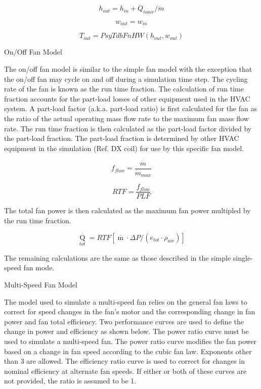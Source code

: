 \begin{equation}
{h_{out}} = {h_{in}} + {\dot Q_{toair}}/\dot m
\end{equation}

\begin{equation}
{w_{out}} = {w_{in}}
\end{equation}

\begin{equation}
{T_{out}} = PsyTdbFnHW({h_{out}},{w_{out}})
\end{equation}

On/Off Fan Model

The on/off fan model is similar to the simple fan model with the exception that the on/off fan may cycle on and off during a simulation time step. The cycling rate of the fan is known as the run time fraction. The calculation of run time fraction accounts for the part-load losses of other equipment used in the HVAC system. A part-load factor (a.k.a. part-load ratio) is first calculated for the fan as the ratio of the actual operating mass flow rate to the maximum fan mass flow rate. The run time fraction is then calculated as the part-load factor divided by the part-load fraction. The part-load fraction is determined by other HVAC equipment in the simulation (Ref. DX coil) for use by this specific fan model.

\begin{equation}
  f_{flow} = \frac{\dot{m}}{\dot{m}_{max}}
\end{equation}

\begin{equation}
  RTF = \frac{f_{flow}}{PLF}
\end{equation}

The total fan power is then calculated as the maximum fan power multipled by the run time fraction.

\begin{equation}
{\mathop Q\limits^\cdot_{tot}} = RTF\left[ {\mathop m\limits^\cdot  \cdot \Delta P/\left( {{e_{tot}}\cdot {\rho_{air}}} \right)} \right]
\end{equation}

The remaining calculations are the same as those described in the simple single-speed fan mode.

Multi-Speed Fan Model

The model used to simulate a multi-speed fan relies on the general fan laws to correct for speed changes in the fan's motor and the corresponding change in fan power and fan total efficiency. Two performance curves are used to define the change in power and efficiency as shown below. The power ratio curve must be used to simulate a multi-speed fan. The power ratio curve modifies the fan power based on a change in fan speed according to the cubic fan law. Exponents other than 3 are allowed. The efficiency ratio curve is used to correct for changes in nominal efficiency at alternate fan speeds. If either or both of these curves are not provided, the ratio is assumed to be 1.

